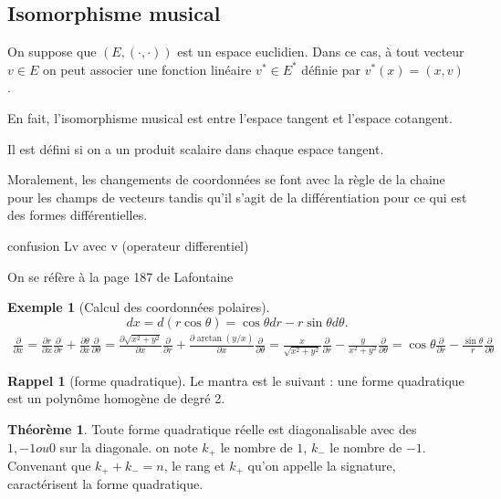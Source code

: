 \documentclass{article}
\theoremstyle{definition} %
\newtheorem{thm}{Théorème}
\newtheorem{ex}{Exemple}
\newtheorem{rap}{Rappel}
\newcommand{\1}{\mathbb{1}} %
\begin{document}
\subsection{Isomorphisme musical}

On suppose que $(E, (\cdot,\cdot) )$ est un espace euclidien. 
Dans ce cas, à tout vecteur $v\in E$ on peut associer une fonction linéaire $v^*\in E^*$ définie par $v^*(x)=(x,v)$.

En fait, l'isomorphisme musical est entre l'espace tangent et l'espace cotangent.

Il est défini si on a un produit scalaire dans chaque espace tangent.

Moralement, les changements de coordonnées se font avec la règle de la chaine pour les champs de vecteurs tandis qu'il s'agit de la différentiation pour ce qui est des formes différentielles.

confusion Lv avec v (operateur differentiel)

On se réfère à la page 187 de Lafontaine

\begin{ex}[Calcul des coordonnées polaires]

$$dx=d(r\cos\theta)=\cos\theta dr-r\sin\theta d\theta.$$
\begin{align*}\frac{\partial}{\partial x}=\frac{\partial r}{\partial x}\frac{\partial}{\partial r}+\frac{\partial \theta}{\partial x}\frac{\partial}{\partial \theta}=\frac{\partial \sqrt{x^2+y^2}}{\partial x}\frac{\partial}{\partial r}+\frac{\partial \arctan(y/x)}{\partial x}\frac{\partial}{\partial \theta}=
\frac{x}{\sqrt{x^2+y^2}}\frac{\partial}{\partial r}-\frac{y}{x^2+y^2}\frac{\partial}{\partial \theta}=
\cos\theta\frac{\partial}{\partial r}-\frac{\sin\theta}{r}\frac{\partial}{\partial \theta}
\end{align*}


\end{ex}

\begin{rap}[forme quadratique]
Le mantra est le suivant : une forme quadratique est un polynôme homogène de degré 2.
\end{rap}

\begin{thm}
    Toute forme quadratique réelle est diagonalisable avec des $1,-1 ou 0$ sur la diagonale.
    on note $k_+$ le nombre de $1$, $k_-$ le nombre de $-1$.
    Convenant que $k_+ + k_-=n$, le rang et $k_+$ qu'on appelle la signature, caractérisent la forme quadratique.
\end{thm}
\end{document}
